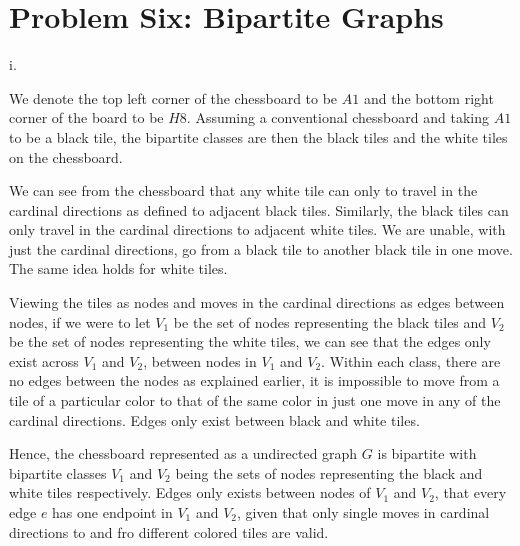 \documentclass{article}
\renewcommand{\(}{\left(}
\renewcommand{\)}{\right)}
\theoremstyle{plain}
\theoremstyle{plain}
\theoremstyle{definition}
\begin{document}
\section*{Problem Six: Bipartite Graphs}
    i.
    \begin{shaded}
        We denote the top left corner of the chessboard to be $A1$ and the bottom right corner of the board to be $H8$. Assuming a conventional chessboard and taking $A1$ to be a black tile, the bipartite classes are then the black tiles and the white tiles on the chessboard.

        \vspace{4mm}

        We can see from the chessboard that any white tile can only to travel in the cardinal directions as defined to adjacent black tiles. Similarly, the black tiles can only travel in the cardinal directions to adjacent white tiles. We are unable, with just the cardinal directions, go from a black tile to another black tile in one move. The same idea holds for white tiles. 

        \vspace{4mm}
        
        Viewing the tiles as nodes and moves in the cardinal directions as edges between nodes, if we were to let $V_{1}$ be the set of nodes representing the black tiles and $V_{2}$ be the set of nodes representing the white tiles, we can see that the edges only exist across $V_{1}$ and $V_{2}$, between nodes in $V_{1}$ and $V_{2}$. Within each class, there are no edges between the nodes as explained earlier, it is impossible to move from a tile of a particular color to that of the same color in just one move in any of the cardinal directions. Edges only exist between black and white tiles.

        \vspace{4mm}

        Hence, the chessboard represented as a undirected graph $G$ is bipartite with bipartite classes $V_{1}$ and $V_{2}$ being the sets of nodes representing the black and white tiles respectively. Edges only exists between nodes of $V_{1}$ and $V_{2}$, that every edge $e$ has one endpoint in $V_{1}$ and $V_{2}$, given that only single moves in cardinal directions to and fro different colored tiles are valid.
    \end{shaded}
    
\end{document}
